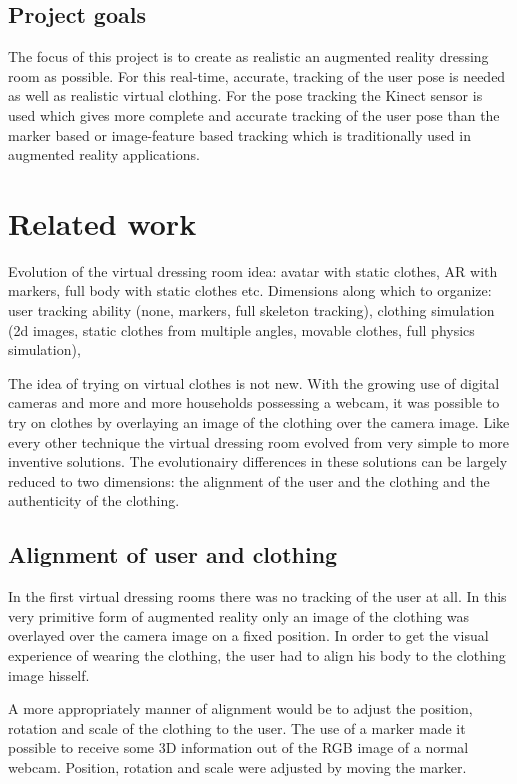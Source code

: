 \documentclass[a4paper]{article}
\begin{document}
\subsection{Project goals}

The focus of this project is to create as realistic an augmented reality dressing room as possible. For this real-time, accurate, tracking of the user pose is needed as well as realistic virtual clothing. For the pose tracking the Kinect sensor is used which gives more complete and accurate tracking of the user pose than the marker based or image-feature based tracking which is traditionally used in augmented reality applications.

\section{Related work}

Evolution of the virtual dressing room idea: avatar with static clothes, AR with markers, full body with static clothes etc. Dimensions along which to organize: user tracking ability (none, markers, full skeleton tracking), clothing simulation (2d images, static clothes from multiple angles, movable clothes, full physics simulation),

The idea of trying on virtual clothes is not new. With the growing use of digital cameras and more and more households possessing a webcam, it was possible to try on clothes by overlaying an image of the clothing over the camera image. Like every other technique the virtual dressing room evolved from very simple to more inventive solutions. The evolutionairy differences in these solutions can be largely reduced to two dimensions: the alignment of the user and the clothing and the authenticity of the clothing.

\subsection{Alignment of user and clothing}

In the first virtual dressing rooms there was no tracking of the user at all. In this very primitive form of augmented reality only an image of the clothing was overlayed over the camera image on a fixed position. In order to get the visual experience of wearing the clothing, the user had to align his body to the clothing image hisself. 


A more appropriately manner of alignment would be to adjust the position, rotation and scale of the clothing to the user. The use of a marker made it possible to receive some 3D information out of the RGB image of a normal webcam. Position, rotation and scale were adjusted by moving the marker.
\end{document}
